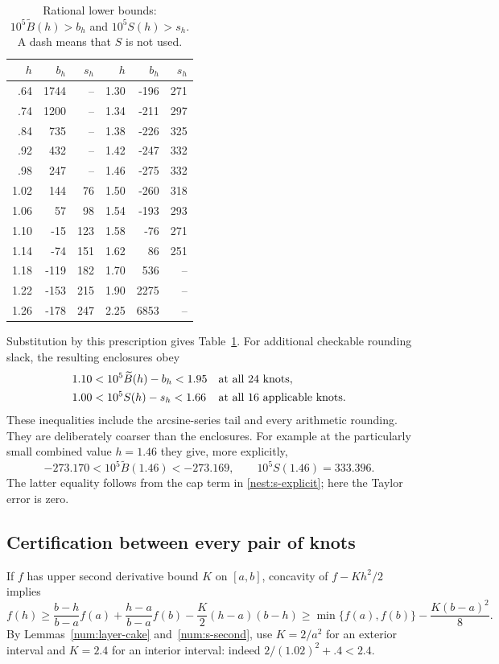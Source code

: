 \begin{table}[H]
\centering
\caption{Rational lower bounds: $10^5\widetilde B(h)>b_h$
and $10^5S(h)>s_h$. A dash means that $S$ is not used.}
\label{num:knot-table}
\begin{tabular}{rrr@{\qquad}rrr}
\toprule
$h$&$b_h$&$s_h$&$h$&$b_h$&$s_h$\\
\midrule
.64&1744&--&1.30&-196&271\\
.74&1200&--&1.34&-211&297\\
.84&735&--&1.38&-226&325\\
.92&432&--&1.42&-247&332\\
.98&247&--&1.46&-275&332\\
1.02&144&76&1.50&-260&318\\
1.06&57&98&1.54&-193&293\\
1.10&-15&123&1.58&-76&271\\
1.14&-74&151&1.62&86&251\\
1.18&-119&182&1.70&536&--\\
1.22&-153&215&1.90&2275&--\\
1.26&-178&247&2.25&6853&--\\
\bottomrule
\end{tabular}
\end{table}

Substitution by this prescription gives Table~\ref{num:knot-table}.
For additional checkable rounding slack, the resulting enclosures obey
\begin{equation}\label{num:table-slack}
 \begin{aligned}
 1.10&<10^5\widetilde B(h)-b_h<1.95
 &&\hbox{at all 24 knots},\\
 1.00&<10^5S(h)-s_h<1.66
 &&\hbox{at all 16 applicable knots}.
 \end{aligned}
\end{equation}
These inequalities include the arcsine-series tail and every arithmetic
rounding. They are deliberately coarser than the enclosures. For
example at the particularly small combined value $h=1.46$ they give,
more explicitly,
\[
 -273.170<10^5\widetilde B(1.46)<-273.169,
 \qquad 10^5S(1.46)=333.396.
\]
The latter equality follows from the cap term in
\eqref{nest:s-explicit}; here the Taylor error is zero.

\subsection{Certification between every pair of knots}

If $f$ has upper second derivative bound $K$ on $[a,b]$, concavity
of $f-Kh^2/2$ implies
\begin{equation}\label{num:chord}
 f(h)\ge\frac{b-h}{b-a}f(a)+\frac{h-a}{b-a}f(b)
             -\frac K2(h-a)(b-h)
 \ge\min\{f(a),f(b)\}-\frac{K(b-a)^2}{8}.
\end{equation}
By Lemmas~\ref{num:layer-cake} and~\ref{num:s-second}, use
$K=2/a^2$ for an exterior interval and $K=2.4$ for an interior
interval: indeed $2/(1.02)^2+.4<2.4$.

